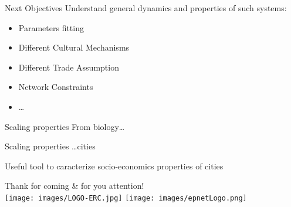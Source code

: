 \documentclass[12pt, notes=show]{beamer}
\begin{document}
\begin{frame}{Next Objectives}
    \vfill
    Understand general dynamics and properties of such systems:
    \vfill
	\begin{itemize}
	\item Parameters fitting
    \vfill
	\item Different Cultural Mechanisms
    \vfill
	\item Different Trade Assumption
    \vfill
	\item Network Constraints
    \vfill
	\item \dots
    \vfill
	\end{itemize}
\end{frame}

\begin{frame}{Scaling properties}
    From biology\dots
\end{frame}
\begin{frame}{Scaling properties}
    \dots cities
    
    Useful tool to caracterize socio-economics properties of cities
\end{frame}




\begin{frame}
	\begin{center}
		\Large
    Thank for coming \& for you attention!\\
		\vspace{1cm}
		\texttt{[image: images/LOGO-ERC.jpg]} \hfil	\texttt{[image: images/epnetLogo.png]}\\
	\end{center}


\end{frame}
\end{document}
